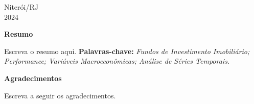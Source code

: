     \begin{center}
        Niterói/RJ\\[0.2cm]
        2024 
    \end{center}
    
    \newpage
    
    \begin{center}
        \textbf{\Large Resumo}\\[0.2cm]
    \end{center}
    
    
    
    \begin{flushleft}
        \setlength{\parskip}{1cm} %
        \linespread{1.5}\selectfont %
        \hspace*{0cm}\parbox{16.5cm}{
            Escreva o resumo aqui.
            \linespread{1.5}\selectfont
            \textbf{Palavras-chave:} \textit{Fundos de Investimento Imobiliário; Performance; Variáveis Macroeconômicas; Análise de Séries Temporais.}
        }
    \end{flushleft}
    \newpage
    
    
    
    \begin{center}
        \textbf{\Large Agradecimentos}\\[0.2cm]
    \end{center}
    
    \begin{flushleft}
        \setlength{\parskip}{1cm} %
        \linespread{1.5}\selectfont %
        \hspace*{0cm}\parbox{16.5cm}{
            Escreva a seguir os agradecimentos.
        }
    
    
    \end{flushleft}
    \newpage
    
    
    
    
    
    \thispagestyle{empty}
    
        
    